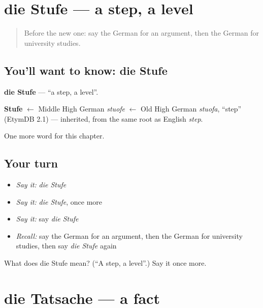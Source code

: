 \section[die Stufe]{die Stufe — a step, a level}

\label{lesson:GE-C239-stufe}



\begin{quote}
Before the new one: say the German for an argument, then the German for university studies.
\end{quote}

\subsection*{You'll want to know: die Stufe}
\textbf{die Stufe} — \textquotedblleft{}a step, a level\textquotedblright{}.

\begin{cousinweb}
\textbf{Stufe} $\leftarrow$ Middle High German \emph{stuofe} $\leftarrow$ Old High German \emph{stuofa}, \textquotedblleft{}step\textquotedblright{} (EtymDB 2.1) — inherited, from the same root as English \emph{step}.
\end{cousinweb}

\begin{grammarlens}[title={What you've built}]
One more word for this chapter.
\end{grammarlens}

\subsection*{Your turn}
\begin{itemize}
\raggedright
  \item \emph{Say it:} \emph{die Stufe}
  \item \emph{Say it:} \emph{die Stufe}, once more
  \item \emph{Say it:} say \emph{die Stufe}
  \item \emph{Recall:} say the German for an argument, then the German for university studies, then say \emph{die Stufe} again
\end{itemize}

\begin{tcolorbox}[breakable,colback=teal!4,colframe=teal!35!black,title={Before you move on}]
What does die Stufe mean? (\textquotedblleft{}A step, a level\textquotedblright{}.) Say it once more.
\end{tcolorbox}
\section[die Tatsache]{die Tatsache — a fact}

